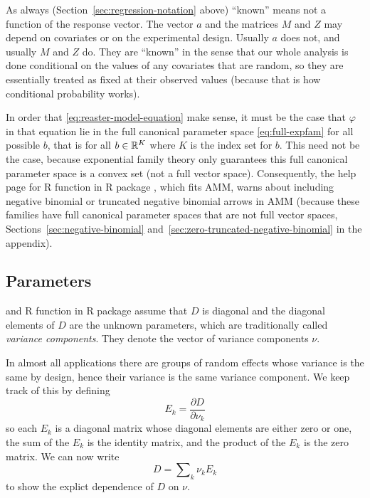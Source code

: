 As always (Section~\ref{sec:regression-notation} above) ``known'' means
not a function of the response vector.  The vector $a$ and the matrices
$M$ and $Z$ may depend on covariates or on the experimental design.
Usually $a$ does not, and usually $M$ and $Z$ do.  They are ``known'' in
the sense that our whole analysis is done conditional on the values of any
covariates that are random, so they are essentially treated as fixed at their
observed values (because that is how conditional probability works).

In order that \eqref{eq:reaster-model-equation} make sense,
it must be the case that
$\varphi$ in that equation lie in the full canonical parameter space
\eqref{eq:full-expfam} for all possible $b$, that is for all $b \in \mathbb{R}^K$
where $K$ is the index set for $b$.  This need not be the case, because
exponential family theory only guarantees this full canonical parameter
space is a convex set (not a full vector space).  Consequently, the help
page for R function  in R package , which fits
AMM, warns about including negative binomial or truncated negative binomial
arrows in AMM (because these families have full canonical parameter
spaces that are not full vector spaces, Sections~\ref{sec:negative-binomial}
and~\ref{sec:zero-truncated-negative-binomial} in the appendix).

\subsection{Parameters}

\citet{reaster} and R function  in R package 
assume that $D$ is diagonal and the diagonal elements of $D$ are the unknown
parameters, which are traditionally called \emph{variance components}.
They denote the vector of variance components $\nu$.

In almost all applications there are groups of random effects whose variance
is the same by design, hence their variance is the same variance component.
We keep track of this by defining
\begin{equation} \label{eq:eek}
   E_k = \frac{\partial D}{\partial \nu_k}
\end{equation}
so each $E_k$ is a diagonal matrix whose diagonal elements are either zero
or one, the sum of the $E_k$ is the identity matrix, and the product of the
$E_k$ is the zero matrix.
We can now write
$$
   D = \sum\nolimits_k \nu_k E_k
$$
to show the explict dependence of $D$ on $\nu$.

